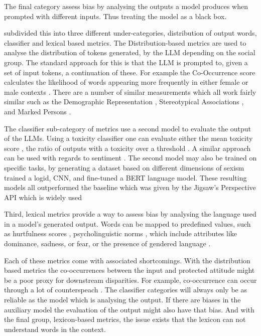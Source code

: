 The final category assess bias by analysing the outputs a model produces when prompted with different inputs. Thus treating the model as a black box.


\citet{gallegos_bias_2024} subdivided this into three different under-categories, distribution of output words, classifier and lexical based metrics. The Distribution-based metrics are used to analyse the distribution of tokens generated, by the LLM depending on the social group. The standard approach for this is that the LLM is prompted to, given a set of input tokens, a continuation of these. For example the Co-Occurrence score calculates the likelihood of words appearing more frequently in either female or male contexts \cite{bordia2019identifying}. There are a number of similar measurements which all work fairly similar such as the Demographic Representation \cite{liang2022holistic}, Stereotypical Associations \cite{liang2022holistic}, and Marked Persons \cite{cheng2023marked}.

The classifier sub-category of metrics use a second model to evaluate the output of the LLMs. Using a toxicity classifier one can evaluate either the mean toxicity score \cite{gehman2020realtoxicityprompts}, the ratio of outputs with a toxicity over a threshold \cite{liang2022holistic}. A similar approach can be used with regards to sentiment \cite{huang2019reducing,sheng2019woman}. The second model may also be trained on specific tasks, by generating a dataset based on different dimensions of sexism \citet{samory2021call} trained a logid, CNN, and fine-tuned a BERT language model. These resulting models all outperformed the baseline which was given by the Jigsaw’s Perspective API \cite{PerspectiveAPI2024} which is widely used  \cite{gehman2020realtoxicityprompts,liang2022holistic}

Third, lexical metrics provide a way to assess bias by analysing the language used in a model's generated output. Words can be mapped to predefined values, such as hurtfulness scores \cite{nozza2021honest}, psycholinguistic norms \cite{dhamala2021bold}, which include attributes like dominance, sadness, or fear, or the presence of gendered language \cite{dhamala2021bold}.

Each of these metrics come with associated shortcomings. With the distribution based metrics the co-occurrences between the input and protected attitude might be a poor proxy for downstream disparities. For example, co-occurrence can occur through a lot of counterspeach \cite{gligoric2024nlp}. The classifier categories will always only be as reliable as the model which is analysing the output. If there are biases in the auxiliary model the evaluation of the output might also have that bias. And with the final group, lexicon-based metrics, the issue exists that the lexicon can not understand words in the context.




